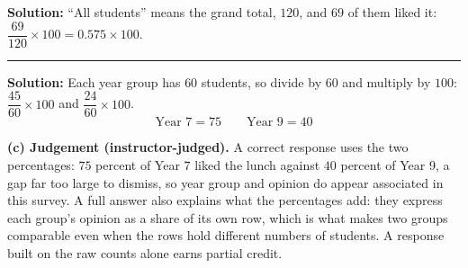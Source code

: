 \documentclass[12pt]{article}
\begin{document}
\textbf{Solution:} \quad ``All students'' means the grand total, $120$, and $69$ of them liked it:
$\dfrac{69}{120} \times 100 = 0.575 \times 100$. 

\vspace{0.2cm}

\noindent\rule{\linewidth}{0.2pt}


\textbf{Solution:} \quad Each year group has $60$ students, so divide by $60$ and multiply by
$100$: $\dfrac{45}{60} \times 100$ and $\dfrac{24}{60} \times 100$.
\[ \boxed{\text{Year 7} = 75 \qquad \text{Year 9} = 40} \]

\textbf{(c) Judgement (instructor-judged).} A correct response uses the two percentages: $75$
percent of Year 7 liked the lunch against $40$ percent of Year 9, a gap far too large to dismiss,
so year group and opinion do appear associated in this survey. A full answer also explains what
the percentages add: they express each group's opinion as a share of its own row, which is what
makes two groups comparable even when the rows hold different numbers of students. A response
built on the raw counts alone earns partial credit.
\end{document}
